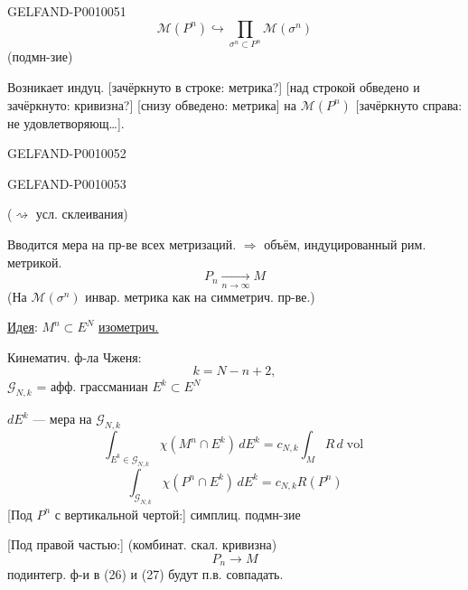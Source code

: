 \begin{GelfandAdjacentEvidence}{GELFAND-P001005}{1}
\begin{equation*}
\mathcal M(P^n)\hookrightarrow\prod_{\sigma^n\subset P^n}\mathcal M(\sigma^n) \tag{25}
\end{equation*}
(подмн-зие)

Возникает индуц. [зачёркнуто в строке: метрика?] [над строкой обведено и зачёркнуто: кривизна?] [снизу обведено: метрика] на $\mathcal M(P^n)$ [зачёркнуто справа: не удовлетворяющ…].
\end{GelfandAdjacentEvidence}
\begin{GelfandAdjacentEvidence}{GELFAND-P001005}{2}

\end{GelfandAdjacentEvidence}
\begin{GelfandAdjacentEvidence}{GELFAND-P001005}{3}

\end{GelfandAdjacentEvidence}


($\rightsquigarrow$ усл. склеивания)

Вводится мера на пр-ве всех метризаций. $\Rightarrow$ объём, индуцированный рим. метрикой.
\[
P_n\underset{n\to\infty}{\longrightarrow}M
\]
(На $\mathcal M(\sigma^n)$ инвар. метрика как на симметрич. пр-ве.)

\underline{Идея}: $M^n\subset E^N$ \underline{изометрич.}

Кинематич. ф-ла Чженя:
\[
k=N-n+2,
\]
$\mathcal G_{N,k}$ = афф. грассманиан $E^k\subset E^N$

$dE^k$ --- мера на $\mathcal G_{N,k}$
\begin{equation*}
\int_{E^k\in\mathcal G_{N,k}}\chi(M^n\cap E^k)\,dE^k
=c_{N,k}\int_M R\,d\operatorname{vol} \tag{26}
\end{equation*}
\begin{equation*}
\int_{\mathcal G_{N,k}}\chi(P^n\cap E^k)\,dE^k
=c_{N,k}R(P^n) \tag{27}
\end{equation*}
[Под $P^n$ с вертикальной чертой:] симплиц. подмн-зие

[Под правой частью:] (комбинат. скал. кривизна)
\[
P_n\longrightarrow M
\]
подинтегр. ф-и в (26) и (27) будут п.в. совпадать.

